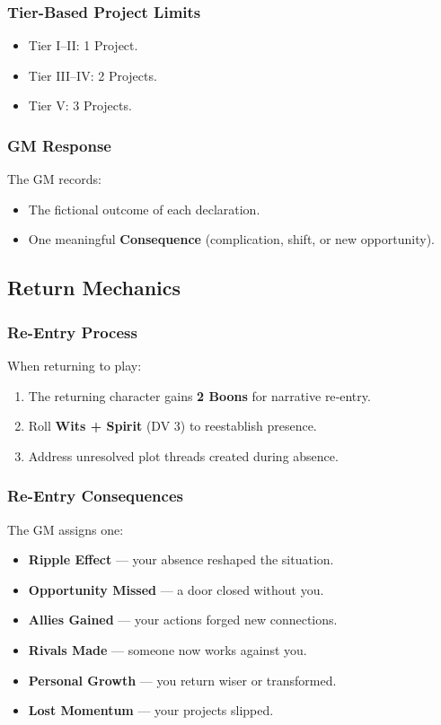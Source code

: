\subsubsection{Tier-Based Project Limits}
\begin{itemize}
    \item Tier I–II: 1 Project.
    \item Tier III–IV: 2 Projects.
    \item Tier V: 3 Projects.
\end{itemize}

\subsubsection{GM Response}
The GM records:
\begin{itemize}
    \item The fictional outcome of each declaration.
    \item One meaningful \textbf{Consequence} (complication, shift, or new opportunity).
\end{itemize}

\subsection{Return Mechanics}
\label{sec:mcs-return}

\subsubsection{Re-Entry Process}
When returning to play:
\begin{enumerate}
    \item The returning character gains \textbf{2 Boons} for narrative re‑entry.
    \item Roll \textbf{Wits + Spirit} (DV 3) to reestablish presence.
    \item Address unresolved plot threads created during absence.
\end{enumerate}

\subsubsection{Re-Entry Consequences}
The GM assigns one:
\begin{itemize}
    \item \textbf{Ripple Effect} — your absence reshaped the situation.
    \item \textbf{Opportunity Missed} — a door closed without you.
    \item \textbf{Allies Gained} — your actions forged new connections.
    \item \textbf{Rivals Made} — someone now works against you.
    \item \textbf{Personal Growth} — you return wiser or transformed.
    \item \textbf{Lost Momentum} — your projects slipped.
\end{itemize}

